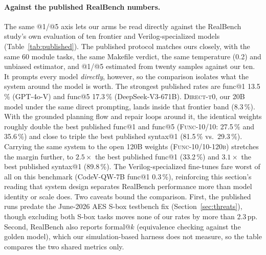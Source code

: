 \paragraph{Against the published RealBench numbers.}
The same @1/@5 axis lets our arms be read directly against the
RealBench study's own evaluation of ten frontier and
Verilog-specialized models~\citep{realbench2025}
(Table~\ref{tab:published}). The published protocol matches ours
closely, with the same 60 module tasks, the same Makefile verdict, the
same temperature (0.2) and unbiased estimator, and @1/@5 estimated
from twenty samples against our ten. It prompts every model
\emph{directly}, however, so the comparison isolates what the system
around the model is worth. The strongest published rates are func@1 13.5\,\%
(GPT-4o-V) and func@5 17.3\,\% (DeepSeek-V3-671B). \textsc{Direct-t0},
our 20B model under the same direct prompting, lands inside
that frontier band (8.3\,\%). With the grounded planning flow and
repair loops around it, the identical weights roughly double the best
published func@1 and func@5 (\textsc{Func-10/10}: 27.5\,\% and
35.6\,\%) and close to triple the best published syntax@1 (81.5\,\%
vs.\ 29.3\,\%). Carrying the same system to the open 120B weights
(\textsc{Func-10/10-120b}) stretches the margin further, to
$2.5\times$ the best published func@1 (33.2\,\%) and $3.1\times$ the
best published syntax@1 (89.8\,\%).
The Verilog-specialized fine-tunes fare worst of all
on this benchmark (CodeV-QW-7B func@1 0.3\,\%), reinforcing this
section's reading that system design separates RealBench performance
more than model identity or scale does. Two caveats bound the
comparison. First, the published runs predate the June-2026 AES S-box
testbench fix (Section~\ref{sec:threats}), though excluding both
S-box tasks moves none of our rates by more than 2.3\,pp. Second,
RealBench also reports formal@$k$ (equivalence checking
against the golden model), which our simulation-based harness does not
measure, so the table compares the two shared metrics only.

